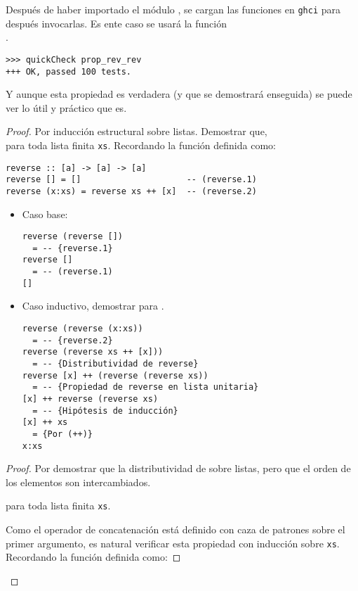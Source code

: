 Después de haber importado el módulo , se cargan las funciones en 
\texttt{ghci} para después invocarlas. Es ente caso se usará la función\\
.
\begin{verbatim}
>>> quickCheck prop_rev_rev
+++ OK, passed 100 tests.
\end{verbatim}

Y aunque esta propiedad es verdadera (y que se demostrará enseguida) se puede ver lo útil y
práctico que es.

\begin{proof}
Por inducción estructural sobre listas. Demostrar que,\\
 para toda lista finita \texttt{xs}.
\hfill \break
Recordando la función  definida como:

\begin{verbatim}
reverse :: [a] -> [a] -> [a]
reverse [] = []                     -- (reverse.1)
reverse (x:xs) = reverse xs ++ [x]  -- (reverse.2)
\end{verbatim}

\begin{itemize}
\item Caso base:
\begin{verbatim}
reverse (reverse [])
  = -- {reverse.1}
reverse []
  = -- (reverse.1)
[]
\end{verbatim}

\item Caso inductivo, demostrar para .
\begin{verbatim}
reverse (reverse (x:xs))
  = -- {reverse.2}
reverse (reverse xs ++ [x]))
  = -- {Distributividad de reverse}
reverse [x] ++ (reverse (reverse xs))
  = -- {Propiedad de reverse en lista unitaria}
[x] ++ reverse (reverse xs)
  = -- {Hipótesis de inducción}
[x] ++ xs
  = {Por (++)}
x:xs
\end{verbatim}
\end{itemize}


\begin{proof}
Por demostrar que la distributividad de  sobre listas, pero que el orden de los
elementos son intercambiados.

 para toda lista finita \texttt{xs}.

Como el operador de concatenación \hsCode{++} está definido con caza de patrones sobre el primer
argumento, es natural verificar esta propiedad con inducción sobre \texttt{xs}.
Recordando la función \hsCode{(++)} definida como:


\end{proof}
\end{proof}

